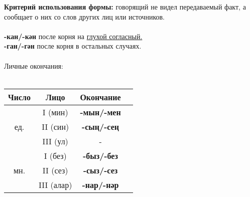 \textbf{Критерий использования формы:} говорящий не видел передаваемый факт, а сообщает о них со слов других лиц
или источников.\\\\
\textbf{-кан/-кән} после корня на \underline{глухой согласный.}\\
\textbf{-ган/-гән} после корня в остальных случаях.\\\\
Личные окончания:\\\\
\begin{tabular}{ |c|c|c|c| } 
\hline
Число & Лицо & Окончание \\
\hline
\multirow{3}{4em}{ед.}
& I (мин) & \textbf{-мын/-мен} \\  
& II (син) & \textbf{-сың/-сең} \\ 
& III (ул) & - \\ 
\hline
\multirow{3}{4em}{мн.}
& I (без) & \textbf{-быз/-без} \\  
& II (сез) & \textbf{-сыз/-сез} \\ 
& III (алар) & \textbf{-нар/-нәр} \\ 
\hline
\end{tabular} \\\\
